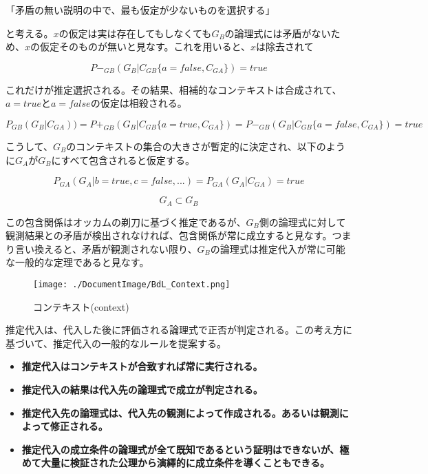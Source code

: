 \documentclass[12pt]{article}
\begin{document}
「矛盾の無い説明の中で、最も仮定が少ないものを選択する」

と考える。\(x\)の仮定は実は存在してもしなくても\(G_B\)の論理式には矛盾がないため、\(x\)の仮定そのものが無いと見なす。これを用いると、\(x\)は除去されて

\begin{equation} P-_{GB}(G_B|C_{GB}\{a=false,C_{GA}\})=true\end{equation}

これだけが推定選択される。その結果、相補的なコンテキストは合成されて、\(a=true\)と\(a=false\)の仮定は相殺される。

\begin{equation} P_{GB}(G_B|C_{GA}))=P+_{GB}(G_B|C_{GB}\{a=true,C_{GA}\})=P-_{GB}(G_B|C_{GB}\{a=false,C_{GA}\})=true\end{equation}

こうして、\(G_B\)のコンテキストの集合の大きさが暫定的に決定され、以下のように\(G_A\)が\(G_B\)にすべて包含されると仮定する。

\begin{equation} P_{GA}(G_A|b=true,c=false,...) = P_{GA}(G_A|C_{GA})=true\end{equation}

\begin{equation} G_A \subset G_B\end{equation}

この包含関係はオッカムの剃刀に基づく推定であるが、\(G_B\)側の論理式に対して観測結果との矛盾が検出されなければ、包含関係が常に成立すると見なす。つまり言い換えると、矛盾が観測されない限り、\(G_B\)の論理式は推定代入が常に可能な一般的な定理であると見なす。

\begin{figure}[ht]
  \centering
  \texttt{[image: ./DocumentImage/BdL\_Context.png]}
  \caption{コンテキスト(context)}
  \label{fig:コンテキスト}
\end{figure}


推定代入は、代入した後に評価される論理式で正否が判定される。この考え方に基づいて、推定代入の一般的なルールを提案する。

\begin{itemize}

\item
  \textbf{推定代入はコンテキストが合致すれば常に実行される。}
\item
  \textbf{推定代入の結果は代入先の論理式で成立が判定される。}
\item
  \textbf{推定代入先の論理式は、代入先の観測によって作成される。あるいは観測によって修正される。}
\item
  \textbf{推定代入の成立条件の論理式が全て既知であるという証明はできないが、極めて大量に検証された公理から演繹的に成立条件を導くこともできる。}
\end{itemize}
\end{document}
